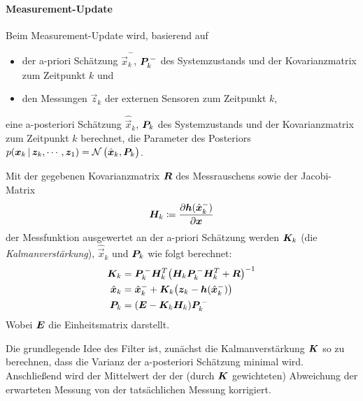 				\paragraph{Measurement-Update} %
					Beim Measurement-Update wird, basierend auf
					\begin{itemize}
						\item der a-priori Schätzung \( \hat{\vec{x}}_k^- \), \( \bm{P}_k^{\,-} \) des Systemzustands und der Kovarianzmatrix zum Zeitpunkt \(k\) und
						\item den Messungen \( \vec{z}_k \) der externen Sensoren zum Zeitpunkt \(k\),
					\end{itemize}
					eine a-posteriori Schätzung \( \hat{\vec{x}}_k \), \( \bm{P}_k \) des Systemzustands und der Kovarianzmatrix zum Zeitpunkt \(k\) berechnet, \dh die Parameter des Posteriors \( p(\bm{x}_k \,\vert\, \bm{z}_k, \cdots, \bm{z}_1) = \mathcal{N}\,\big(\hat{\bm{x}}_k, \bm{P}_k\big) \).

					Mit der gegebenen Kovarianzmatrix \( \bm{R} \) des Messrauschens sowie der Jacobi-Matrix
					\begin{equation*}
						\bm{H}_k \coloneqq \frac{\partial \bm{h}(\hat{\bm{x}}_k^-)}{\partial \bm{x}}
					\end{equation*}
					der Messfunktion ausgewertet an der a-priori Schätzung werden \( \bm{K}_k \) (die \emph{Kalmanverstärkung}), \( \hat{\vec{x}}_k \) und \( \bm{P}_k \) wie folgt berechnet:
					\begin{align*}
						\bm{K}_k &= \bm{P}_k^{\,-} \bm{H}_k^T \big( \bm{H}_k \bm{P}_k^{\,-} \bm{H}_k^T + \bm{R} \big)^{-1} \\
						\hat{\bm{x}}_k &= \hat{\bm{x}}_k^- + \bm{K}_k \big( \bm{z}_k - \bm{h}(\hat{\bm{x}}_k^-) \big) \\
						\bm{P}_k &= (\bm{E} - \bm{K}_k \bm{H}_k) \bm{P}_k^{\,-}
					\end{align*}
					Wobei \( \bm{E} \) die Einheitsmatrix darstellt.

					Die grundlegende Idee des Filter ist, zunächst die Kalmanverstärkung \( \bm{K} \) so zu berechnen, dass die Varianz der a-posteriori Schätzung minimal wird. Anschließend wird der Mittelwert der der (durch \( \bm{K} \) gewichteten) Abweichung der erwarteten Messung von der tatsächlichen Messung korrigiert.

